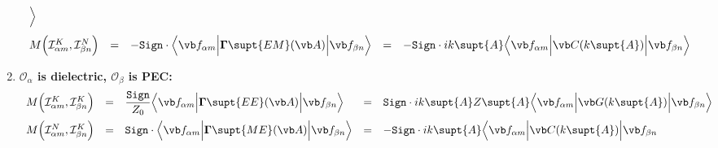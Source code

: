 \begin{enumerate}
$$\begin{array}{lclcl}
{                 \Big\rangle
               }
\\[10pt]
 M\Big( \mathcal{I}^K_{\alpha m}, \mathcal{I}^N_{\beta n} \Big) 
  &=&
  \displaystyle{ -\texttt{Sign}\cdot
                 \Big\langle 
                 \vb f_{\alpha m} 
                 \Big| \BG\supt{EM}(\vb A) \Big|
                 \vb f_{\beta n} 
                 \Big\rangle
               }
  &=&
  \displaystyle{ -\texttt{Sign}\cdot ik\supt{A}
                  \Big\langle 
                  \vb f_{\alpha m} 
                  \Big| \vb C(k\supt{A})\Big|
                  \vb f_{\beta n} 
                  \Big\rangle
               }
\end{array}$$
\item \textbf{ $\mathcal{O}_\alpha$ is dielectric, 
               $\mathcal{O}_\beta$ is PEC:}
$$\begin{array}{lclcl}
 M\Big( \mathcal{I}^K_{\alpha m}, \mathcal{I}^K_{\beta n} \Big) 
  &=& 
  \displaystyle{ \frac{\texttt{Sign}}{Z_0} 
                 \Big\langle \vb f_{\alpha m} 
                 \Big| \BG\supt{EE}(\vb A) \Big|
                 \vb f_{\beta n} 
                 \Big\rangle
               }
  &=&
  \displaystyle{ \texttt{Sign}\cdot ik\supt{A} Z\supt{A}
                 \Big\langle \vb f_{\alpha m} 
                 \Big| \vb G(k\supt{A}) \Big|
                 \vb f_{\beta n} 
                 \Big\rangle
               }
\\[10pt]
 M\Big( \mathcal{I}^N_{\alpha m}, \mathcal{I}^K_{\beta n} \Big) 
  &=&
  \displaystyle{ \texttt{Sign}\cdot
                 \Big\langle 
                 \vb f_{\alpha m} 
                 \Big| \BG\supt{ME}(\vb A) \Big|
                 \vb f_{\beta n} 
                 \Big\rangle
               }
  &=&
  \displaystyle{ -\texttt{Sign}\cdot ik\supt{A}
                  \Big\langle 
                  \vb f_{\alpha m} 
                  \Big| \vb C(k\supt{A})\Big|
                  \vb f_{\beta n} 
}
\end{array}$$
\end{enumerate}

